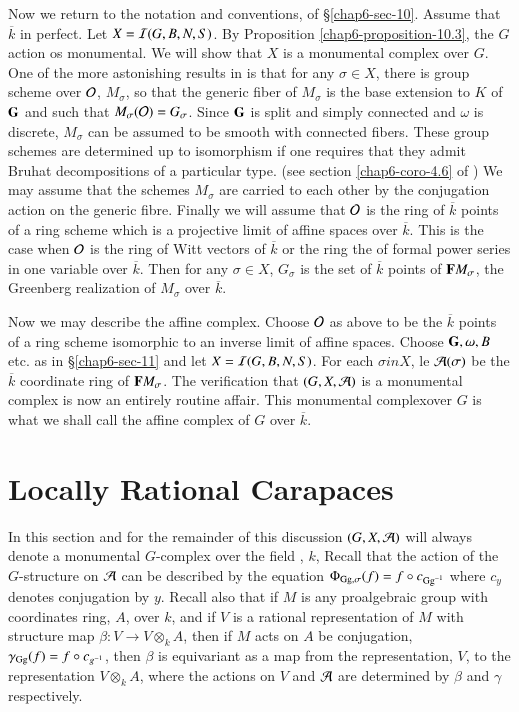 Now we return to the notation and conventions, of \S \ref{chap6-sec-10}. Assume that $\overline{k}$ in perfect. Let $X = \mathcal{I}(G, B, N, S)$. By Proposition \ref{chap6-proposition-10.3}, the $G$ action os monumental. We will show that $X$ is a monumental complex over $G$. One of the more astonishing results in \cite{chap6-keyBT-II} is that for any $\sigma \in X$, there is group scheme over $\mathcal{O}$, $M_{\sigma}$, so that the generic fiber of $M_{\sigma}$ is the base extension to $K$ of $\mathbf{G}$ and such that $M_{\sigma}(\mathcal{O}) = G_{\sigma}$. Since $\mathbf{G}$ is split and simply connected and $\omega$ is discrete, $M_{\sigma}$ can be assumed to be smooth with connected fibers. These group schemes are determined up to isomorphism if one requires that they admit Bruhat decompositions of a particular type. (see section \ref{chap6-coro-4.6} of \cite{chap6-keyBT-II}) We may assume that the schemes $M_{\sigma}$ are carried to each other by the conjugation action on the generic fibre. Finally we will assume that $\mathcal{O}$ is the ring of $\overline{k}$ points of a ring scheme which is a projective limit of affine spaces over $\overline{k}$. This is the case when $\mathcal{O}$ is the ring of Witt vectors of $\overline{k}$ or the ring the of formal power series in one variable over $\overline{k}$. Then for any $\sigma \in X$, $G_{\sigma}$ is the set of $\overline{k}$ points of $\mathbf{F} M_{\sigma}$, the Greenberg realization of $M_{\sigma}$ over $\overline{k}$.  

Now we may describe the affine complex. Choose $\mathcal{O}$ as above to be the $\overline{k}$ points of a ring scheme isomorphic to an inverse limit of affine spaces. Choose $\mathbf{G}, \omega, B$ etc. as in \S \ref{chap6-sec-11} and let $X = \mathcal{I}(G, B, N, S)$. For each $\sigma in X$, le $\mathcal{A}(\sigma)$ be the $\overline{k}$ coordinate ring of $\mathbf{F} M_{\sigma}$. The verification that $(G, X, \mathcal{A})$ is a monumental complex is now an  entirely routine affair. This monumental complex\pageoriginale over $G$ is what we shall call the affine complex of $G$ over $\overline{k}$.

\section{Locally Rational Carapaces}\label{chap6-sec-13}
 In this section and for the remainder of this discussion $(G, X, \mathcal{A})$ will always denote a monumental $G$-complex over the field , $k$, Recall that the action of the $G$-structure on $\mathcal{A}$ can be described by the equation $\Phi_{\operatorname{Gg}, \sigma}(f) = f \circ c_{\operatorname{Gg}^{-1}}$ where $c_{y}$ denotes conjugation by $y$. Recall also that if $M$ is any proalgebraic group with coordinates ring, $A$, over $k$, and if $V$ is a rational representation of $M$ with structure map $\beta : V \rightarrow V \otimes_{k} A$, then if $M$ acts on $A$ be conjugation,  $\gamma_{\operatorname{Gg}}(f) = f \circ c_{g^{-1}}$, then $\beta$ is equivariant as a map from the representation, $V$, to the representation $V\otimes_{k} A$, where the actions on $V$ and $\mathcal{A}$ are determined by $\beta$ and $\gamma$ respectively.

